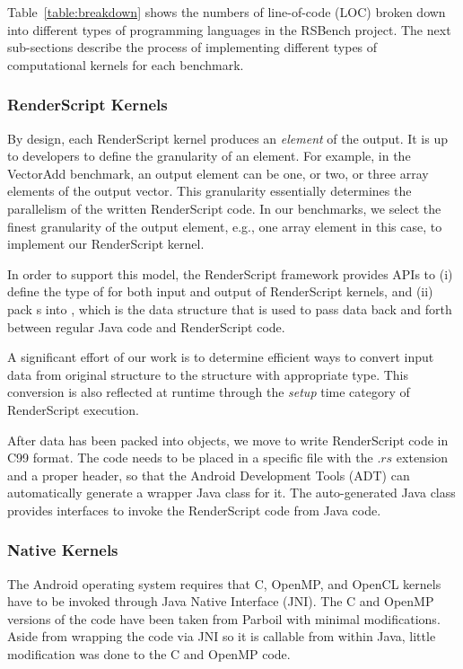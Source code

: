 Table~\ref{table:breakdown} shows the numbers of line-of-code (LOC) broken down
into different types of programming languages in the RSBench project. The next
sub-sections describe the process of implementing different types of computational
kernels for each benchmark.

\subsubsection{RenderScript Kernels}

By design, each RenderScript kernel produces an \textit{element} of the output.
It is up to developers to define the granularity of an element. For example, in
the VectorAdd benchmark, an output element can be one, or two, or three array
elements of the output vector. This granularity essentially determines the
parallelism of the written RenderScript code. In our benchmarks, we select the
finest granularity of the output element, e.g., one array element in this case,
to implement our RenderScript kernel.

In order to support this model, the RenderScript framework provides APIs to (i)
define the type of  for both input and output of RenderScript
kernels, and (ii) pack s into , which is the data
structure that is used to pass data back and forth between regular Java code and
RenderScript code.

A significant effort of our work is to determine efficient ways to convert input
data from original structure to the  structure with appropriate
 type. This conversion is also reflected at runtime through the
\textit{setup} time category of RenderScript execution.

After data has been packed into  objects, we move to write
RenderScript code in C99 format. The code needs to be placed in a specific file
with the $.rs$ extension and a proper header, so that the Android Development
Tools (ADT) can automatically generate a wrapper Java class for it. The
auto-generated Java class provides interfaces to invoke the RenderScript code
from Java code.

\subsubsection{Native Kernels}

The Android operating system requires that C, OpenMP, and OpenCL kernels have to
be invoked through Java Native Interface (JNI).  The C and OpenMP versions of
the code have been taken from Parboil with minimal modifications.  
Aside from wrapping the code via JNI so it is callable from within Java,
	little modification was done to the C and OpenMP code.


